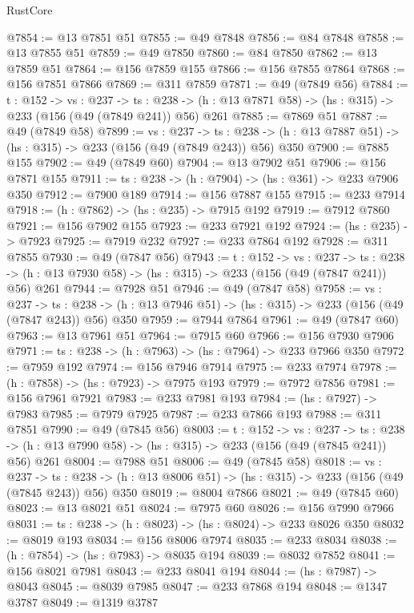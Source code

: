 \begin{lexlean}{RustCore}
\begin{coremodule}
@7854 := @13 @7851 @51
@7855 := @49 @7848
@7856 := @84 @7848
@7858 := @13 @7855 @51
@7859 := @49 @7850
@7860 := @84 @7850
@7862 := @13 @7859 @51
@7864 := @156 @7859 @155
@7866 := @156 @7855 @7864
@7868 := @156 @7851 @7866
@7869 := @311 @7859
@7871 := @49 (@7849 @56)
@7884 := {t : @152} ->
  {vs : @237} ->
  {ts : @238} -> (h : @13 @7871 @58) -> (hs : @315) -> @233 (@156 (@49 (@7849 @241)) @56) @261
@7885 := @7869 @51
@7887 := @49 (@7849 @58)
@7899 := {vs : @237} ->
  {ts : @238} -> (h : @13 @7887 @51) -> (hs : @315) -> @233 (@156 (@49 (@7849 @243)) @56) @350
@7900 := @7885 @155
@7902 := @49 (@7849 @60)
@7904 := @13 @7902 @51
@7906 := @156 @7871 @155
@7911 := {ts : @238} -> (h : @7904) -> (hs : @361) -> @233 @7906 @350
@7912 := @7900 @189
@7914 := @156 @7887 @155
@7915 := @233 @7914
@7918 := (h : @7862) -> (hs : @235) -> @7915 @192
@7919 := @7912 @7860
@7921 := @156 @7902 @155
@7923 := @233 @7921 @192
@7924 := (hs : @235) -> @7923
@7925 := @7919 @232
@7927 := @233 @7864 @192
@7928 := @311 @7855
@7930 := @49 (@7847 @56)
@7943 := {t : @152} ->
  {vs : @237} ->
  {ts : @238} -> (h : @13 @7930 @58) -> (hs : @315) -> @233 (@156 (@49 (@7847 @241)) @56) @261
@7944 := @7928 @51
@7946 := @49 (@7847 @58)
@7958 := {vs : @237} ->
  {ts : @238} -> (h : @13 @7946 @51) -> (hs : @315) -> @233 (@156 (@49 (@7847 @243)) @56) @350
@7959 := @7944 @7864
@7961 := @49 (@7847 @60)
@7963 := @13 @7961 @51
@7964 := @7915 @60
@7966 := @156 @7930 @7906
@7971 := {ts : @238} -> (h : @7963) -> (hs : @7964) -> @233 @7966 @350
@7972 := @7959 @192
@7974 := @156 @7946 @7914
@7975 := @233 @7974
@7978 := (h : @7858) -> (hs : @7923) -> @7975 @193
@7979 := @7972 @7856
@7981 := @156 @7961 @7921
@7983 := @233 @7981 @193
@7984 := (hs : @7927) -> @7983
@7985 := @7979 @7925
@7987 := @233 @7866 @193
@7988 := @311 @7851
@7990 := @49 (@7845 @56)
@8003 := {t : @152} ->
  {vs : @237} ->
  {ts : @238} -> (h : @13 @7990 @58) -> (hs : @315) -> @233 (@156 (@49 (@7845 @241)) @56) @261
@8004 := @7988 @51
@8006 := @49 (@7845 @58)
@8018 := {vs : @237} ->
  {ts : @238} -> (h : @13 @8006 @51) -> (hs : @315) -> @233 (@156 (@49 (@7845 @243)) @56) @350
@8019 := @8004 @7866
@8021 := @49 (@7845 @60)
@8023 := @13 @8021 @51
@8024 := @7975 @60
@8026 := @156 @7990 @7966
@8031 := {ts : @238} -> (h : @8023) -> (hs : @8024) -> @233 @8026 @350
@8032 := @8019 @193
@8034 := @156 @8006 @7974
@8035 := @233 @8034
@8038 := (h : @7854) -> (hs : @7983) -> @8035 @194
@8039 := @8032 @7852
@8041 := @156 @8021 @7981
@8043 := @233 @8041 @194
@8044 := (hs : @7987) -> @8043
@8045 := @8039 @7985
@8047 := @233 @7868 @194
@8048 := @1347 @3787
@8049 := @1319 @3787

\end{coremodule}
\end{lexlean}
